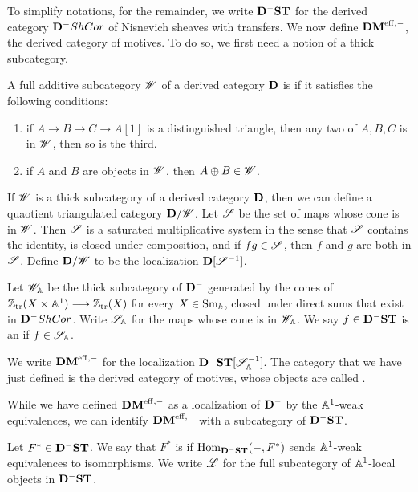 To simplify notations, for the remainder, we write $\DShCor$ for 
the derived category $\DCat^-\ShCor$ of Nisnevich sheaves with 
transfers. We now define $\DMeff$, the derived category of 
motives. To do so, we first need a notion of a thick subcategory.

\begin{defn}
A full additive subcategory $\Cat{W}$ of a derived category 
$\DCat$ is  if it satisfies the following conditions:
\begin{enumerate}
\item if $A \to B \to C \to A[1]$ is a distinguished triangle, then
any two of $A, B, C$ is in $\Cat{W}$, then so is the third.

\item if $A$ and $B$ are objects in $\Cat{W}$, then $A \oplus B \in
\Cat{W}$.
\end{enumerate}
\end{defn}

If $\Cat{W}$ is a thick subcategory of a derived category $\DCat$,
then we can define a quaotient triangulated category 
$\DCat/\Cat{W}$. Let $\Cat{S}$ be the set of maps whose cone is in 
$\Cat{W}$. Then $\Cat{S}$ is a saturated multiplicative system in 
the sense that $\Cat{S}$ contains the identity, is closed under 
composition, and if $fg \in \Cat{S}$, then $f$ and $g$ are both in 
$\Cat{S}$. Define $\DCat/\Cat{W}$ to be the localization 
$\DCat[D] [\Cat{S}^{-1}]$.

\begin{defn}\label{def_DMeff}
Let $\Cat{W}_{\A}$ be the thick subcategory of $\DCat^-$ generated 
by the cones of $\Ztr(X \times \A^1) \to \Ztr(X)$ for every $X \in 
\Sm$, closed under direct sums that exist in $\DCat^-\ShCor$. 
Write $\Cat{S}_{\A}$ for the maps whose cone is in $\Cat{W}_{\A}$. 
We say $f \in \DShCor$ is an  if $f 
\in \Cat{S}_{\A}$.

We write $\DMeff$ for the localization 
$\DShCor [\Cat{S}_{\A}^{-1}]$. The category that we have
just defined is the derived category of motives, whose objects are
called .
\end{defn}

While we have defined $\DMeff$ as a localization of 
$\DCat^-$ by the $\A^1$-weak equivalences, we can identify
$\DMeff$ with a subcategory of $\DShCor$.

\begin{defn}
Let $F^* \in \DShCor$. We say that $F^*$ is  if
$\hom_{\DShCor}(-, F^*)$ sends $\A^1$-weak equivalences to 
isomorphisms. We write $\ALocal$ for the full subcategory of 
$\A^1$-local objects in $\DShCor$.
\end{defn}

